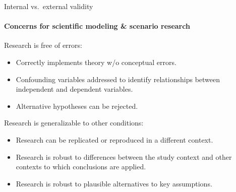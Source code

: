 \begin{frame}{Internal vs.\ external validity}
\framesubtitle{Concerns for scientific modeling \& scenario research}

 Research is free of errors:

\begin{itemize}
  \item Correctly implements theory w/o conceptual errors.
  \item Confounding variables addressed to identify relationships between independent and dependent variables.
  \item Alternative hypotheses can be rejected.
\end{itemize}

\bigskip
{} Research is generalizable to other conditions:

\begin{itemize}
  \item Research can be replicated or reproduced in a different context.
  \item Research is robust to differences between the study context and other contexts to which conclusions are applied.
  \item Research is robust to plausible alternatives to key assumptions.
\end{itemize}

\end{frame}
